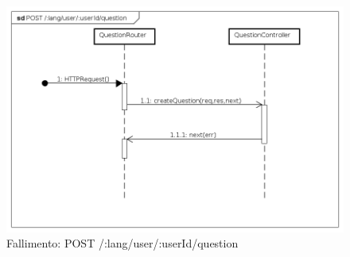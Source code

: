 \begin{itemize}
\begin{figure}[ht]
	\centering
	\includegraphics[scale=0.45]{UML/DiagrammiDiSequenza/Back-end/POST__lang_user__userId_question_failure.png}
	\caption{Fallimento: POST /:lang/user/:userId/question}
\end{figure}
\FloatBarrier

\end{itemize}
